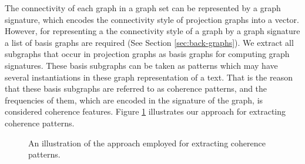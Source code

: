 The connectivity of each graph in a graph set can be represented by a graph signature, which encodes the connectivity style of projection graphs into a vector. 
However, for representing a the connectivity style of a graph by a graph signature a list of basis graphs are required (See Section \ref{sec:back-graphs}).  
We extract all subgraphs that occur in projection graphs as basis graphs for computing graph signatures. 
These basis subgraphs can be taken as patterns which may have several instantiations in these graph representation of a text.  
That is the reason that these basis subgraphs are referred to as coherence patterns, and the frequencies of them, which are encoded in the signature of the graph, is considered coherence features. 
Figure \ref{fig:pattern-extraction} illustrates our approach for extracting coherence patterns.

\begin{figure}[!ht]
	\begin{center}
	\end{center}
	\caption{An illustration of the approach employed for extracting coherence patterns.}
	\label{fig:pattern-extraction}
\end{figure}


